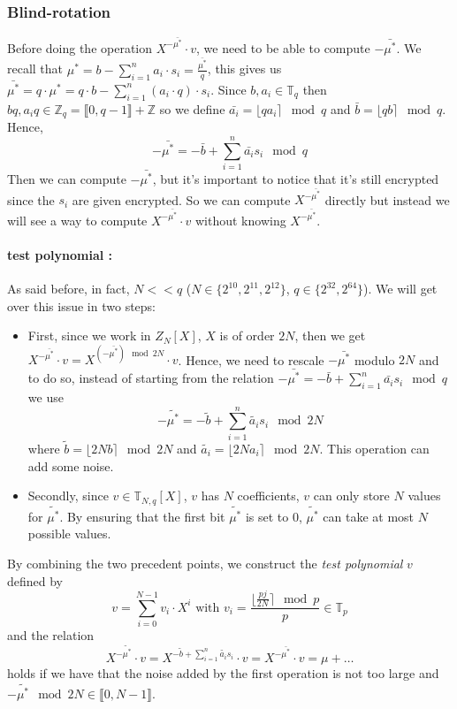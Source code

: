 \documentclass{article}
\newcommand{\Z}{\mathbb{Z}}
\newcommand{\T}{\mathbb{T}}
\newcommand{\round}[1]{\lfloor#1\rceil}
\theoremstyle{definition}
\theoremstyle{Theorem}
\begin{document}
\subsubsection{Blind-rotation} \label{blind-rotation}

Before doing the operation $X^{-\bar{\mu^*}} \cdot v$, we need to be able to compute $-\bar{\mu^*}$. We recall that $\mu^*= b - \sum_{i=1}^n a_i\cdot s_i =\frac{\bar{\mu^*}}{q}$, this gives us $\bar{\mu^*} = q\cdot \mu^* = q\cdot b - \sum_{i=1}^n (a_i\cdot q) \cdot s_i$. Since $b,a_i\in\T_q$ then $bq,a_iq \in \Z_q = \llbracket 0, q-1 \rrbracket + \Z$ so we define $\bar{a_i} = \round{q a_i} \mod q$ and $\bar{b} = \round{qb}\mod q$. Hence, 
$$-\bar{\mu^*} = -\bar{b} + \sum_{i=1}^{n} \bar{a_i}s_i \mod q$$
Then we can compute $-\bar{\mu^*}$, but it's important to notice that it's still encrypted since the $s_i$ are given encrypted. So we can compute $X^{-\bar{\mu^*}}$ directly but instead we will see a way to compute $X^{-\bar{\mu^*}} \cdot v$ without knowing $X^{-\bar{\mu^*}}$.

\paragraph{test polynomial :}
As said before, in fact, $N << q$ ($N \in \{2^{10},2^{11},2^{12}\}$,  $q \in \{2^{32},2^{64}\}$). We will get over this issue in two steps: 
\begin{itemize}
    \item First, since we work in $Z_N[X]$, $X$ is of order $2N$, then we get $X^{-\bar{\mu^*}} \cdot v = X^{(-\bar{\mu^*})\mod 2N} \cdot v$. Hence, we need to rescale $-\bar{\mu^*}$ modulo $2N$ and to do so, instead of starting from the relation $-\bar{\mu^*} = -\bar{b} + \sum_{i=1}^{n} \bar{a_i}s_i \mod q$ we use 
$$-\tilde{\mu^*} = -\tilde{b} + \sum_{i=1}^{n} \tilde{a_i}s_i \mod 2N$$
where $\tilde{b}=\round{2Nb}\mod2N$ and $\tilde{a_i} = \round{2Na_i}\mod2N$. This operation can add some noise.

    \item Secondly, since $v\in\T_{N,q}[X]$, $v$ has $N$ coefficients, $v$ can only store $N$ values for $\tilde{\mu^*}$. By ensuring that the first bit $\tilde{\mu^*}$ is set to $0$, $\tilde{\mu^*}$ can take at most $N$ possible values. 
\end{itemize}
By combining the two precedent points, we construct the \textit{test polynomial} $v$ defined by 
$$v = \sum_{i=0}^{N-1}v_i\cdot X^i \text{ with } v_i = \frac{\round{\frac{pj}{2N}}\mod p}{p} \in \T_p$$
and the relation 
$$ X^{-\tilde{\mu^*}}\cdot v = X^{-\tilde{b} + \sum_{i=1}^{n} \tilde{a_i}s_i} \cdot v= X^{-\bar{\mu^*}} \cdot v = \mu +\ldots$$
holds if we have that the noise added by the first operation is not too large and $-\tilde{\mu^*}\mod 2N \in \llbracket 0,N-1\rrbracket$.
\end{document}
